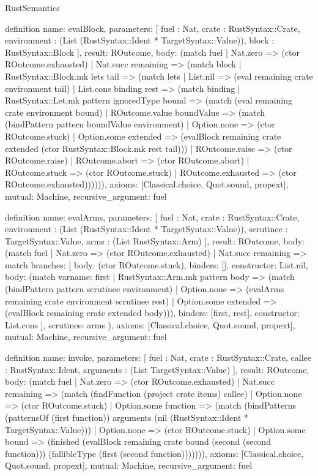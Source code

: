 \begin{lexlean}{RustSemantics}
\begin{semanticmodule}
definition{
  name: evalBlock,
  parameters: [
    fuel : Nat,
    crate : RustSyntax::Crate,
    environment : (List (RustSyntax::Ident * TargetSyntax::Value)),
    block : RustSyntax::Block
  ],
  result: ROutcome,
  body: (match fuel
    | Nat.zero => (ctor ROutcome.exhausted)
    | Nat.succ remaining => (match block
      | RustSyntax::Block.mk lets tail => (match lets
        | List.nil => (eval remaining crate environment tail)
        | List.cons binding rest => (match binding
          | RustSyntax::Let.mk pattern ignoredType bound => (match (eval remaining crate environment bound)
            | ROutcome.value boundValue => (match (bindPattern pattern boundValue environment)
              | Option.none => (ctor ROutcome.stuck)
              | Option.some extended => (evalBlock remaining crate extended (ctor RustSyntax::Block.mk rest tail)))
            | ROutcome.raise => (ctor ROutcome.raise)
            | ROutcome.abort => (ctor ROutcome.abort)
            | ROutcome.stuck => (ctor ROutcome.stuck)
            | ROutcome.exhausted => (ctor ROutcome.exhausted)))))),
  axioms: [Classical.choice, Quot.sound, propext],
  mutual: Machine,
  recursive_argument: fuel
}

definition{
  name: evalArms,
  parameters: [
    fuel : Nat,
    crate : RustSyntax::Crate,
    environment : (List (RustSyntax::Ident * TargetSyntax::Value)),
    scrutinee : TargetSyntax::Value,
    arms : (List RustSyntax::Arm)
  ],
  result: ROutcome,
  body: (match fuel
    | Nat.zero => (ctor ROutcome.exhausted)
    | Nat.succ remaining => match{
      branches: [
        {body: (ctor ROutcome.stuck), binders: [], constructor: List.nil},
        {
          body: (match var{name: first}
            | RustSyntax::Arm.mk pattern body => (match (bindPattern pattern scrutinee environment)
              | Option.none => (evalArms remaining crate environment scrutinee rest)
              | Option.some extended => (evalBlock remaining crate extended body))),
          binders: [first, rest],
          constructor: List.cons
        }
      ],
      scrutinee: arms
    }),
  axioms: [Classical.choice, Quot.sound, propext],
  mutual: Machine,
  recursive_argument: fuel
}

definition{
  name: invoke,
  parameters: [
    fuel : Nat,
    crate : RustSyntax::Crate,
    callee : RustSyntax::Ident,
    arguments : (List TargetSyntax::Value)
  ],
  result: ROutcome,
  body: (match fuel
    | Nat.zero => (ctor ROutcome.exhausted)
    | Nat.succ remaining => (match (findFunction (project crate items) callee)
      | Option.none => (ctor ROutcome.stuck)
      | Option.some function => (match (bindPatterns (patternsOf (first function)) arguments (nil (RustSyntax::Ident * TargetSyntax::Value)))
        | Option.none => (ctor ROutcome.stuck)
        | Option.some bound => (finished (evalBlock remaining crate bound (second (second function))) (fallibleType (first (second function))))))),
  axioms: [Classical.choice, Quot.sound, propext],
  mutual: Machine,
  recursive_argument: fuel
}


\end{semanticmodule}
\end{lexlean}
